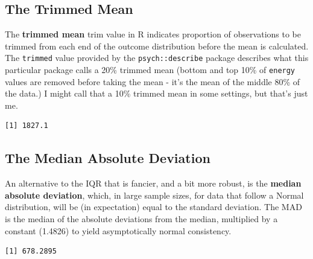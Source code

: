 \documentclass[
]{book}
\newenvironment{Shaded}{\begin{snugshade}}{\end{snugshade}}
\newcommand{\DataTypeTok}[1]{\textcolor[rgb]{0.13,0.29,0.53}{#1}}
\newcommand{\DecValTok}[1]{\textcolor[rgb]{0.00,0.00,0.81}{#1}}
\newcommand{\KeywordTok}[1]{\textcolor[rgb]{0.13,0.29,0.53}{\textbf{#1}}}
\newcommand{\NormalTok}[1]{#1}
\newcommand{\OperatorTok}[1]{\textcolor[rgb]{0.81,0.36,0.00}{\textbf{#1}}}
\begin{document}
\hypertarget{the-trimmed-mean}{%
\subsection{The Trimmed Mean}\label{the-trimmed-mean}}

The \textbf{trimmed mean} trim value in R indicates proportion of observations to be trimmed from each end of the outcome distribution before the mean is calculated. The \texttt{trimmed} value provided by the \texttt{psych::describe} package describes what this particular package calls a 20\% trimmed mean (bottom and top 10\% of \texttt{energy} values are removed before taking the mean - it's the mean of the middle 80\% of the data.) I might call that a 10\% trimmed mean in some settings, but that's just me.

\begin{Shaded}
\end{Shaded}

\begin{verbatim}
[1] 1827.1
\end{verbatim}

\hypertarget{the-median-absolute-deviation}{%
\subsection{The Median Absolute Deviation}\label{the-median-absolute-deviation}}

An alternative to the IQR that is fancier, and a bit more robust, is the \textbf{median absolute deviation}, which, in large sample sizes, for data that follow a Normal distribution, will be (in expectation) equal to the standard deviation. The MAD is the median of the absolute deviations from the median, multiplied by a constant (1.4826) to yield asymptotically normal consistency.

\begin{Shaded}
\end{Shaded}

\begin{verbatim}
[1] 678.2895
\end{verbatim}
\end{document}
